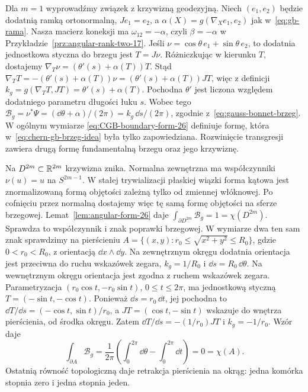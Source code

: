 Dla $m=1$ wyprowadźmy związek z krzywizną geodezyjną.
Niech $(e_1,e_2)$ będzie dodatnią ramką ortonormalną,
$Je_1=e_2$, a
$\alpha(X)=g(\nabla_Xe_1,e_2)$ jak w~\eqref{eq:gb-rama}.
Nasza macierz koneksji ma $\omega_{12}=-\alpha$,
czyli $\beta=-\alpha$ w
Przykładzie~\ref{prz:angular-rank-two-17}.
Jeśli $\nu=\cos\theta\,e_1+\sin\theta\,e_2$,
to dodatnia jednostkowa styczna do brzegu jest $T=J\nu$.
Różniczkując w kierunku $T$, dostajemy
$\nabla_T\nu=(\theta'(s)+\alpha(T))T$.
Stąd $\nabla_TT=-(\theta'(s)+\alpha(T))\nu
=(\theta'(s)+\alpha(T))JT$, więc z definicji
$k_g=g(\nabla_TT,JT)=\theta'(s)+\alpha(T)$.
Pochodna $\theta'$ jest liczona względem dodatniego parametru
długości łuku $s$. Wobec tego
$\mathcal B_g=\nu^*\Psi
=(\dd\theta+\alpha)/(2\pi)=k_g\,\dd s/(2\pi)$,
zgodnie z~\eqref{eq:gauss-bonnet-brzeg}.
W ogólnym wymiarze
\eqref{eq:CGB-boundary-form-26}
definiuje formę, która
w~\eqref{eq:chern-gb-brzeg-idea}
była tylko zapowiedziana.
Rozwinięcie transgresji
zawiera drugą formę
fundamentalną brzegu
oraz jego krzywiznę.

\begin{przyklad}
\label{prz:CGB-ball-26}
Na $D^{2m}\subset\mathbb{R}^{2m}$
krzywizna znika. Normalna
zewnętrzna ma współczynniki $\nu(u)=u$
na $S^{2m-1}$. W stałej trywializacji płaskiej wiązki
forma kątowa jest znormalizowaną formą objętości
zależną tylko od zmiennej włóknowej.
Po cofnięciu przez normalną dostajemy więc tę samą
formę objętości na sferze brzegowej.
Lemat~\ref{lem:angular-form-26}
daje $\int_{\partial D^{2m}}\mathcal B_g=1
=\chi(D^{2m})$.
Sprawdza to współczynnik
i znak poprawki brzegowej.
W wymiarze dwa ten sam znak sprawdzimy na pierścieniu
$A=\{(x,y):r_0\leq\sqrt{x^2+y^2}\leq R_0\}$,
gdzie $0<r_0<R_0$, z orientacją $\dd x\wedge\dd y$.
Na zewnętrznym okręgu dodatnia orientacja jest przeciwna
do ruchu wskazówek zegara, $k_g=1/R_0$ i $\dd s=R_0\,\dd\theta$.
Na wewnętrznym okręgu orientacja jest zgodna z ruchem
wskazówek zegara.
Parametryzacja $(r_0\cos t,-r_0\sin t)$, $0\leq t\leq2\pi$,
ma jednostkową styczną $T=(-\sin t,-\cos t)$.
Ponieważ $\dd s=r_0\,\dd t$, jej pochodna to
$\dd T/\dd s=(-\cos t,\sin t)/r_0$,
a $JT=(\cos t,-\sin t)$ wskazuje do wnętrza pierścienia,
od środka okręgu.
Zatem $\dd T/\dd s=-(1/r_0)JT$ i $k_g=-1/r_0$.
Wzór daje
\[
 \int_{\partial A}\mathcal B_g
 =\frac1{2\pi}\left(\int_0^{2\pi}\dd\theta
                    -\int_0^{2\pi}\dd t\right)=0=\chi(A).
\]
Ostatnią równość topologiczną daje retrakcja pierścienia
na okrąg: jedna komórka stopnia zero i jedna stopnia jeden.
\end{przyklad}

